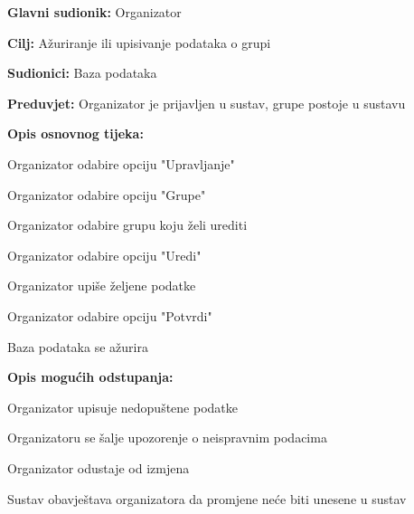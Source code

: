 					\noindent {}
					\begin{packed_item}
						
						\item \textbf{Glavni sudionik: } Organizator
						\item  \textbf{Cilj:} Ažuriranje ili upisivanje podataka o grupi
						\item  \textbf{Sudionici:} Baza podataka
						\item  \textbf{Preduvjet:} Organizator je prijavljen u sustav, grupe postoje u sustavu
						\item  \textbf{Opis osnovnog tijeka:}
						
						\item[] \begin{packed_enum}
							
							\item Organizator odabire opciju "Upravljanje"
							\item Organizator odabire opciju "Grupe"
							\item Organizator odabire grupu koju želi urediti
							\item Organizator odabire opciju "Uredi"
							\item Organizator upiše željene podatke
							\item Organizator odabire opciju "Potvrdi"
							\item Baza podataka se ažurira
						\end{packed_enum}
						
						\item  \textbf{Opis mogućih odstupanja:}
						
						\item[] \begin{packed_item}
							
							\item[5.a] Organizator upisuje nedopuštene podatke
							\item[] \begin{packed_enum}
								
								\item Organizatoru se šalje upozorenje o neispravnim podacima
								
							\end{packed_enum}
							\item[5.b] Organizator odustaje od izmjena
							\item [] \begin{packed_enum}
								
								\item Sustav obavještava organizatora da promjene neće biti unesene u sustav
							\end{packed_enum}
						\end{packed_item}
					\end{packed_item}
				
